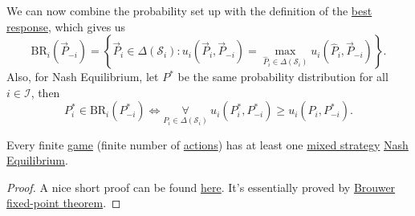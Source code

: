 We can now combine the probability set up with the definition of the \hyperref[def:best-response]{best response}, which gives us
\[
	\mathrm{BR}_{i}(\overrightarrow{P}_{-i}) = \left\{\overrightarrow{P}_i\in \Delta(\mathcal{S}_i)\colon u_{i}(\overrightarrow{P}_i, \overrightarrow{P}_{-i}) = \max_{\hat{P}_i\in \Delta(\mathcal{S}_i)}u_{i}(\hat{P}_i, \overrightarrow{P}_{-i})\right\}.
\]
Also, for Nash Equilibrium, let \(P^{\ast}\) be the same probability distribution for all \(i\in \mathcal{I} \), then
\[
	P^{\ast}_i\in\mathrm{BR}_i(P^{\ast}_{-i})\iff \underset{P_{i}\in \Delta(\mathcal{S}_i)}{\forall }\ u_{i}(P^{\ast}_i, P^{\ast}_{-i})\geq u_{i}(P_{i}, P^{\ast}_{-i}).
\]

\begin{theorem}\label{thm:Nash-existence-theorem}
	Every finite \hyperref[def:mathematical-game]{game} (finite number of \hyperref[def:strategy]{actions}) has at least one \hyperref[def:mixed-strategy]{mixed strategy}
	\hyperref[def:Nash-equilibrium]{Nash Equilibrium}.
\end{theorem}
\begin{proof}
	A nice short proof can be found \href{https://www.cs.ubc.ca/~kevinlb/papers/TR-2007-25.pdf}{here}. It's essentially proved by
	\href{https://en.wikipedia.org/wiki/Brouwer_fixed-point_theorem}{Brouwer fixed-point theorem}.
\end{proof}